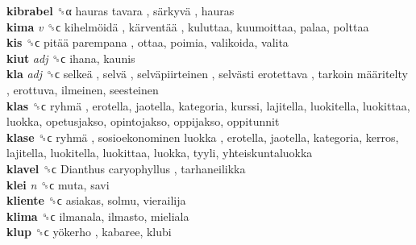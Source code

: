 \textbf{kibrabel} ␝α   hauras tavara ,  särkyvä , hauras  \\
\textbf{kima} \emph{v}  ␝ϲ   kihelmöidä ,  kärventää , kuluttaa, kuumoittaa, palaa, polttaa  \\
\textbf{kis} ␝ϲ   pitää parempana , ottaa, poimia, valikoida, valita  \\
\textbf{kiut} \emph{adj}  ␝ϲ  ihana, kaunis  \\
\textbf{kla} \emph{adj}  ␝ϲ   selkeä ,  selvä ,  selväpiirteinen ,  selvästi erotettava ,  tarkoin määritelty , erottuva, ilmeinen, seesteinen  \\
\textbf{klas} ␝ϲ   ryhmä , erotella, jaotella, kategoria, kurssi, lajitella, luokitella, luokittaa, luokka, opetusjakso, opintojakso, oppijakso, oppitunnit  \\
\textbf{klase} ␝ϲ   ryhmä ,  sosioekonominen luokka , erotella, jaotella, kategoria, kerros, lajitella, luokitella, luokittaa, luokka, tyyli, yhteiskuntaluokka  \\
\textbf{klavel} ␝ϲ   Dianthus caryophyllus , tarhaneilikka  \\
\textbf{klei} \emph{n}  ␝ϲ  muta, savi  \\
\textbf{kliente} ␝ϲ  asiakas, solmu, vierailija  \\
\textbf{klima} ␝ϲ  ilmanala, ilmasto, mieliala  \\
\textbf{klup} ␝ϲ   yökerho , kabaree, klubi  \\
